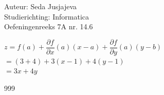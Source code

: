\documentclass[a4paper]{article}
\begin{document}
\noindent \large Auteur: Seda Jusjajeva\\
\noindent \large Studierichting: Informatica\\
\noindent \large Oefeningenreeks 7A nr. 14.6\\

\medskip

\normalsize


$z = f(a) + \dfrac{\partial f}{\partial x}(a)(x - a) + \dfrac{\partial f}{\partial y}(a)(y - b)$ \\

$= (3 + 4) + 3(x - 1) + 4(y - 1)$ \\

$= 3x + 4y$ \\




\begin{thebibliography}{999}
\end{thebibliography}
\end{document}
